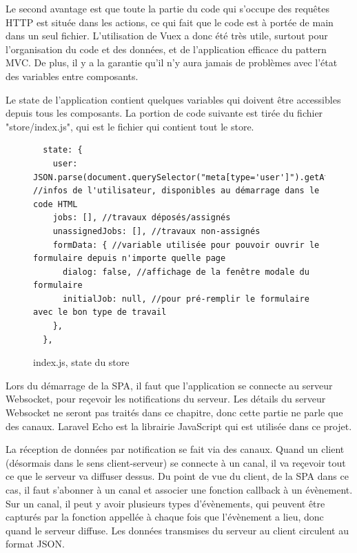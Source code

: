 \documentclass[
    iai, %
    eai, %
]{heig-tb}
\begin{document}
Le second avantage est que toute la partie du code qui s'occupe des requêtes HTTP est située dans les actions, ce qui fait que le code est à portée de main dans un seul fichier.
L'utilisation de Vuex a donc été très utile, surtout pour l'organisation du code et des données, et de l'application efficace du pattern MVC.
De plus, il y a la garantie qu'il n'y aura jamais de problèmes avec l'état des variables entre composants.

Le state de l'application contient quelques variables qui doivent être accessibles depuis tous les composants. La portion de code suivante est tirée du fichier "store/index.js", qui est le fichier qui contient tout le store.

\newpage
\begin{figure}[h]
  \begin{verbatim}
  state: {
    user: JSON.parse(document.querySelector("meta[type='user']").getAttribute("value")), //infos de l'utilisateur, disponibles au démarrage dans le code HTML
    jobs: [], //travaux déposés/assignés
    unassignedJobs: [], //travaux non-assignés
    formData: { //variable utilisée pour pouvoir ouvrir le formulaire depuis n'importe quelle page
      dialog: false, //affichage de la fenêtre modale du formulaire
      initialJob: null, //pour pré-remplir le formulaire avec le bon type de travail
    },
  },
  \end{verbatim}
  \caption{index.js, state du store}
\end{figure}

Lors du démarrage de la SPA, il faut que l'application se connecte au serveur Websocket, pour reçevoir les notifications du serveur.
Les détails du serveur Websocket ne seront pas traités dans ce chapitre, donc cette partie ne parle que des canaux. Laravel Echo est la librairie JavaScript qui est utilisée dans ce projet.

La réception de données par notification se fait via des canaux. Quand un client (désormais dans le sens client-serveur) se connecte à un canal, il va reçevoir tout ce que le serveur va diffuser dessus. Du point de vue du client, de la SPA dans ce cas, il faut s'abonner à un canal et associer une fonction callback à un évènement. Sur un canal, il peut y avoir plusieurs types d'évènements, qui peuvent être capturés par la fonction appellée à chaque fois que l'évènement a lieu, donc quand le serveur diffuse. Les données transmises du serveur au client circulent au format JSON.
\end{document}
